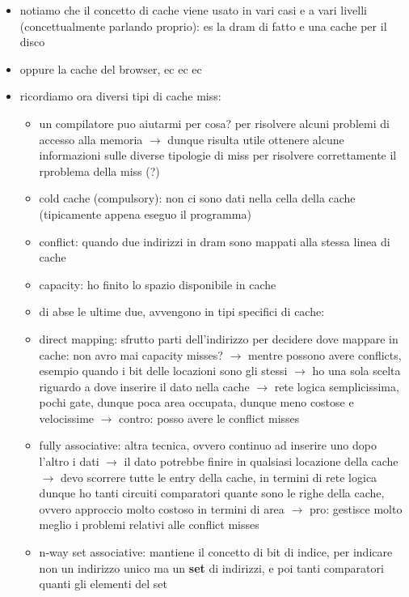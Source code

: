 \begin{itemize}
\begin{itemize}
\begin{itemize}
          \item notiamo che il concetto di cache viene usato in vari casi e a vari livelli (concettualmente parlando proprio): es la dram di fatto e una cache per il disco
          \item oppure la cache del browser, ec ec ec
          \item ricordiamo ora diversi tipi di cache miss:
            \begin{itemize}
              \item un compilatore puo aiutarmi per cosa? per risolvere alcuni problemi di accesso alla memoria $\rightarrow$ dunque risulta utile ottenere alcune informazioni sulle diverse tipologie di miss per risolvere correttamente il rproblema della miss (?)
              \item cold cache (compulsory): non ci sono dati nella cella della cache (tipicamente appena eseguo il programma)
              \item conflict: quando due indirizzi in dram sono mappati alla stessa linea di cache
              \item capacity: ho finito lo spazio disponibile in cache
              \item di abse le ultime due, avvengono in tipi specifici di cache:
              \item direct mapping: sfrutto parti dell'indirizzo per decidere dove mappare in cache: non avro mai capacity misses? $\rightarrow$ mentre possono avere conflicts, esempio quando i bit delle locazioni sono gli stessi $\rightarrow$ ho una sola scelta riguardo a dove inserire il dato nella cache $\rightarrow$ rete logica semplicissima, pochi gate, dunque poca area occupata, dunque meno costose e velocissime $\rightarrow$ contro: posso avere le conflict misses
              \item fully associative: altra tecnica, ovvero continuo ad inserire uno dopo l'altro i dati $\rightarrow$ il dato potrebbe finire in qualsiasi locazione della cache $\rightarrow$ devo scorrere tutte le entry della cache, in termini di rete logica dunque ho tanti circuiti comparatori quante sono le righe della cache, ovvero approccio molto costoso in termini di area $\rightarrow$ pro: gestisce molto meglio i problemi relativi alle conflict misses
              \item n-way set associative: mantiene il concetto di bit di indice, per indicare non un indirizzo unico ma un \textbf{set} di indirizzi, e poi tanti comparatori quanti gli elementi del set 
            \end{itemize}
        \end{itemize}
    \end{itemize}
\end{itemize}

